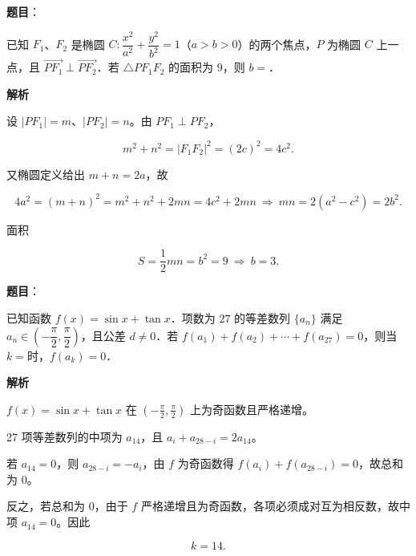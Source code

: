 \begin{answer}

\textbf{题目}：

已知 $F_1$、$F_2$ 是椭圆 $C:\dfrac{x^2}{a^2}+\dfrac{y^2}{b^2}=1$（$a>b>0$）的两个焦点，$P$ 为椭圆 $C$ 上一点，且 $\overrightarrow{PF_1}\perp\overrightarrow{PF_2}$．若 $\triangle PF_1F_2$ 的面积为 $9$，则 $b=$\gkblank{}．

\textbf{解析}

设 $|PF_1|=m$、$|PF_2|=n$。由 $PF_1\perp PF_2$，

\nopagebreak[4]
\[m^2+n^2=|F_1F_2|^2=(2c)^2=4c^2 .\]

又椭圆定义给出 $m+n=2a$，故

\nopagebreak[4]
\[4a^2=(m+n)^2=m^2+n^2+2mn=4c^2+2mn
\ \Longrightarrow\ mn=2(a^2-c^2)=2b^2 .\]

面积

\nopagebreak[4]
\[S=\frac12mn=b^2=9\ \Longrightarrow\ b=3 .\]


\end{answer}
\begin{answer}

\textbf{题目}：

已知函数 $f(x)=\sin x+\tan x$．项数为 $27$ 的等差数列 $\{a_n\}$ 满足 $a_n\in\left(-\dfrac{\pi}{2},\dfrac{\pi}{2}\right)$，且公差 $d\neq0$．若 $f(a_1)+f(a_2)+\cdots+f(a_{27})=0$，则当 $k=$\gkblank{}时，$f(a_k)=0$．

\textbf{解析}

$f(x)=\sin x+\tan x$ 在 $\left(-\frac\pi2,\frac\pi2\right)$ 上为奇函数且严格递增。

27 项等差数列的中项为 $a_{14}$，且 $a_i+a_{28-i}=2a_{14}$。

若 $a_{14}=0$，则 $a_{28-i}=-a_i$，由 $f$ 为奇函数得 $f(a_i)+f(a_{28-i})=0$，故总和为 $0$。

反之，若总和为 $0$，由于 $f$ 严格递增且为奇函数，各项必须成对互为相反数，故中项 $a_{14}=0$。因此

\nopagebreak[4]
\[k=14 .\]


\end{answer}
